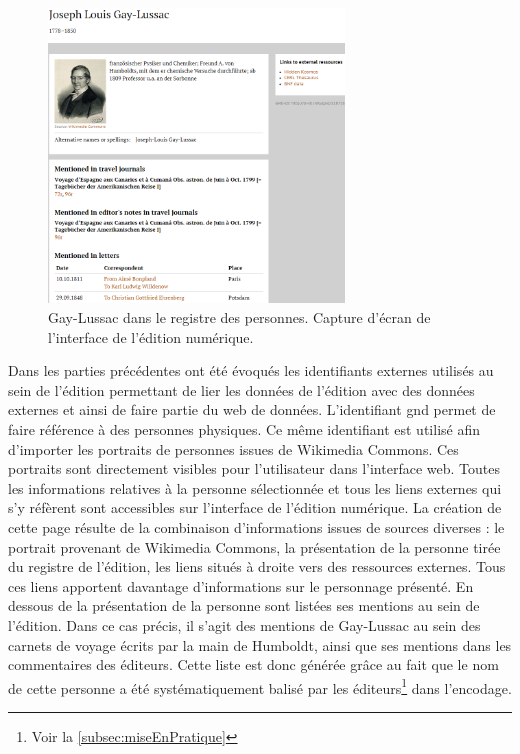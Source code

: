 \documentclass[a4paper, 12pt, twoside]{book}
\begin{document}
\begin{figure}
\centering
\includegraphics[width=0.7\textwidth]{img/portrait_gaylussac.png}
\caption{Gay-Lussac dans le registre des personnes. Capture d'écran de l'interface de l'édition numérique.}
\end{figure}

Dans les parties précédentes ont été évoqués les identifiants externes utilisés au sein de l'édition permettant de lier les données de l'édition avec des données externes et ainsi de faire partie du web de données. L'identifiant \gls{gnd} permet de faire référence à des personnes physiques. Ce même identifiant est utilisé afin d'importer les portraits de personnes issues de Wikimedia Commons. Ces portraits sont directement visibles pour l'utilisateur dans l'interface web. Toutes les informations relatives à la personne sélectionnée et tous les liens externes qui s'y réfèrent sont accessibles sur l'interface de l'édition numérique. La création de cette page résulte de la combinaison d'informations issues de sources diverses : le portrait provenant de Wikimedia Commons, la présentation de la personne tirée du registre de l'édition, les liens situés à droite vers des ressources externes. Tous ces liens apportent davantage d'informations sur le personnage présenté. En dessous de la présentation de la personne sont listées ses mentions au sein de l'édition. Dans ce cas précis, il s'agit des mentions de Gay-Lussac au sein des carnets de voyage écrits par la main de Humboldt, ainsi que ses mentions dans les commentaires des éditeurs. Cette liste est donc générée grâce au fait que le nom de cette personne a été systématiquement balisé par les éditeurs\footnote{Voir la \autoref{subsec:miseEnPratique}} dans l'encodage. 
\end{document}
